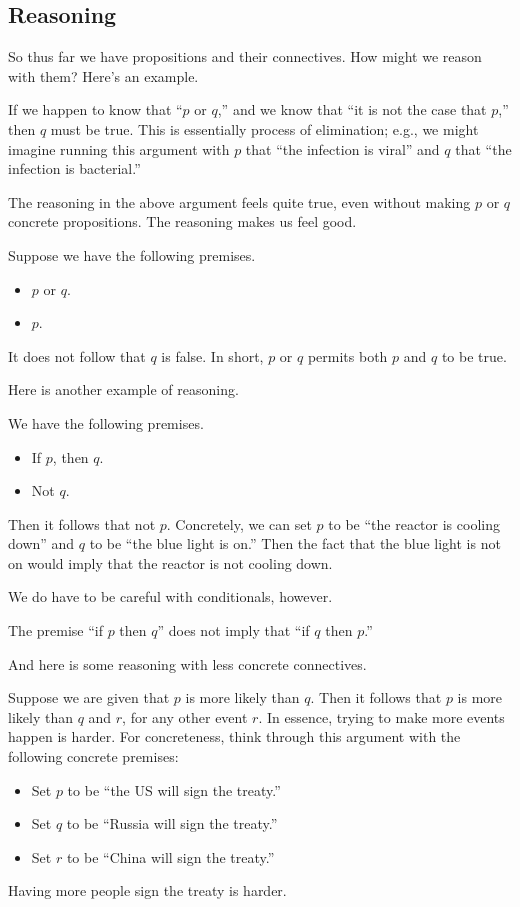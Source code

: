 \subsection{Reasoning}
So thus far we have propositions and their connectives. How might we reason with them? Here's an example.
\begin{example}
	If we happen to know that ``$p$ or $q$,'' and we know that ``it is not the case that $p$,'' then $q$ must be true. This is essentially process of elimination; e.g., we might imagine running this argument with $p$ that ``the infection is viral'' and $q$ that ``the infection is bacterial.''
\end{example}
The reasoning in the above argument feels quite true, even without making $p$ or $q$ concrete propositions. The reasoning makes us feel good.
\begin{warn}
	Suppose we have the following premises.
	\begin{itemize}
		\item $p$ or $q$.
		\item $p$.
	\end{itemize}
	It does not follow that $q$ is false. In short, $p$ or $q$ permits both $p$ and $q$ to be true.
\end{warn}
Here is another example of reasoning.
\begin{example}
	We have the following premises.
	\begin{itemize}
		\item If $p$, then $q$.
		\item Not $q$.
	\end{itemize}
	Then it follows that not $p$. Concretely, we can set $p$ to be ``the reactor is cooling down'' and $q$ to be ``the blue light is on.'' Then the fact that the blue light is not on would imply that the reactor is not cooling down.
\end{example}
We do have to be careful with conditionals, however.
\begin{warn}
	The premise ``if $p$ then $q$'' does not imply that ``if $q$ then $p$.''
\end{warn}
And here is some reasoning with less concrete connectives.
\begin{example}
	Suppose we are given that $p$ is more likely than $q$. Then it follows that $p$ is more likely than $q$ and $r$, for any other event $r$. In essence, trying to make more events happen is harder. For concreteness, think through this argument with the following concrete premises:
	\begin{itemize}
		\item Set $p$ to be ``the US will sign the treaty.''
		\item Set $q$ to be ``Russia will sign the treaty.''
		\item Set $r$ to be ``China will sign the treaty.''
	\end{itemize}
	Having more people sign the treaty is harder.
\end{example}
